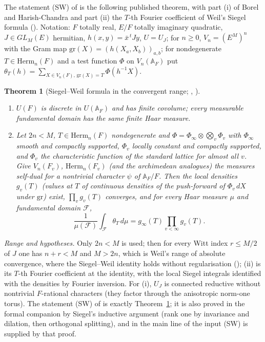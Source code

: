 \documentclass[10pt]{amsart}
\newtheorem{theorem}{Theorem}[section]
\theoremstyle{definition}
\theoremstyle{remark}
\begin{document}
The statement (SW) of \cite[Definition~\ref{A-i3:S-def-SW}]{Annex} is the
following published theorem, with part (i) of Borel and Harish-Chandra and
part (ii) the $T$-th Fourier coefficient of Weil's Siegel formula
(\cite[Proposition~\ref{A-i3:prop-SW}]{Annex}). Notation: $F$ totally real,
$E/F$ totally imaginary quadratic, $J\in GL_M(E)$ hermitian,
$h(x,y)=\bar x^{\,t}Jy$, $U=U_J$; for $n\ge0$, $V_n=(E^M)^n$ with the Gram
map $\mathrm{gr}(X)=(h(X_a,X_b))_{a,b}$; for nondegenerate
$T\in\mathrm{Herm}_n(F)$ and a test function $\Phi$ on $V_n(\mathbb A_F)$ put
$\theta_T(h)=\sum_{X\in V_n(F),\,\mathrm{gr}(X)=T}\Phi(h^{-1}X)$.

\begin{theorem}[Siegel--Weil formula in the convergent range;
\cite{BorelHC1962}, \cite{Weil1965}]\label{inp:thm-SW}
\begin{enumerate}
\item[(i)] $U(F)$ is discrete in $U(\mathbb A_F)$ and has finite covolume;
every measurable fundamental domain has the same finite Haar measure.
\item[(ii)] Let $2n<M$, $T\in\mathrm{Herm}_n(F)$ nondegenerate and
$\Phi=\Phi_\infty\otimes\bigotimes_v\Phi_v$ with $\Phi_\infty$ smooth and
compactly supported, $\Phi_v$ locally constant and compactly supported, and
$\Phi_v$ the characteristic function of the standard lattice for almost all
$v$. Give $V_n(F_v)$, $\mathrm{Herm}_n(F_v)$ (and the archimedean analogues)
the measures self-dual for a nontrivial character $\psi$ of $\mathbb
A_F/F$. Then the local densities $g_v(T)$ (values at $T$ of continuous
densities of the push-forward of $\Phi_v\,dX$ under $\mathrm{gr}$) exist,
$\prod_vg_v(T)$ converges, and for every Haar measure $\mu$ and fundamental
domain $\mathcal F$,
\[
\frac1{\mu(\mathcal F)}\int_{\mathcal F}\theta_T\,d\mu
 =g_\infty(T)\prod_{v<\infty}g_v(T).
\]
\end{enumerate}
\end{theorem}

\noindent \emph{Range and hypotheses.} Only $2n<M$ is used; then for every
Witt index $r\le M/2$ of $J$ one has $n+r<M$ and $M>2n$, which is Weil's
range of absolute convergence, where the Siegel--Weil identity holds without
regularisation (\cite[Theorem~\ref{A-i4:thm-sw}]{Annex}); (ii) is its $T$-th
Fourier coefficient at the identity, with the local Siegel integrals
identified with the densities by Fourier inversion. For (i), $U_J$ is
connected reductive without nontrivial $F$-rational characters (they factor
through the anisotropic norm-one torus). The statement (SW) of
\cite[Definition~\ref{A-i3:S-def-SW}]{Annex} is exactly
Theorem~\ref{inp:thm-SW}; it is also proved in the formal
companion \cite{CharacterFamily} by Siegel's inductive argument (rank one by
invariance and dilation, then orthogonal splitting), and in the main line of
\cite{CharacterFamily} the input (SW) is supplied by that proof.
\end{document}
